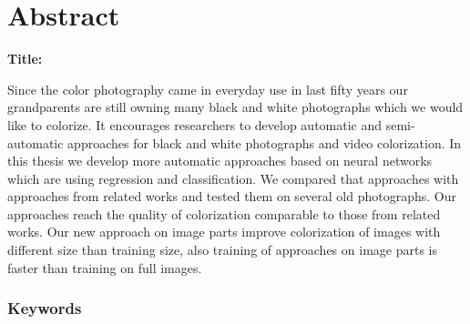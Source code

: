 \chapter*{Abstract}

\noindent\textbf{Title:} \ttitleEn
\bigskip

Since the color photography came in everyday use in last fifty years our grandparents are still owning many black and white photographs which we would like to colorize. It encourages researchers to develop automatic and semi-automatic approaches for black and white photographs and video colorization.  
In this thesis we develop more automatic approaches based on neural networks which are using regression and classification. We compared that approaches with approaches from related works and tested them on several old photographs.  
Our approaches reach the quality of colorization comparable to those from related works. Our new approach on image parts improve colorization of images with different size than training size, also training of approaches on image parts is faster than training on full images.  


\subsection*{Keywords}
\textit{\tkeywordsEn}
\clearemptydoublepage